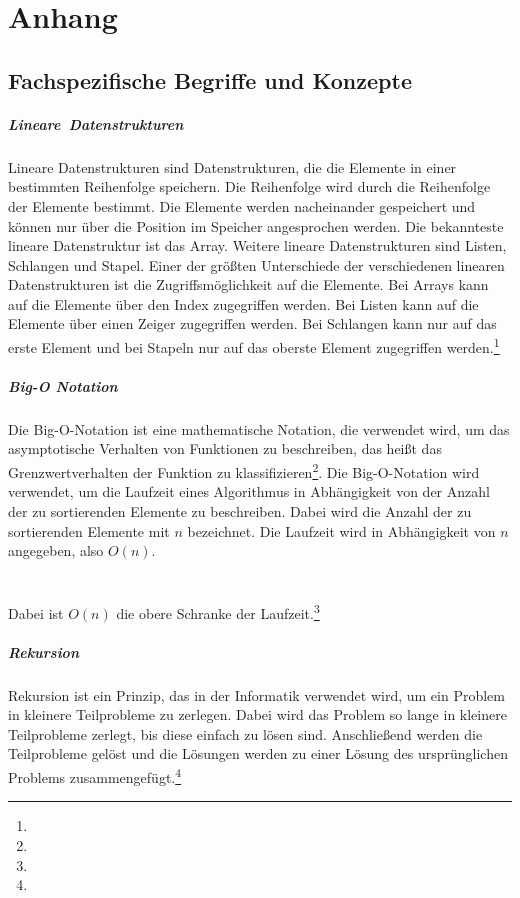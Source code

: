 \documentclass[./entry.tex]{subfiles}
\begin{document}
    \chapter{Anhang}

    \section{Fachspezifische Begriffe und Konzepte}

    \paragraph{Lineare\ Datenstrukturen}
    Lineare Datenstrukturen sind Datenstrukturen, die die Elemente in einer bestimmten Reihenfolge speichern. Die
    Reihenfolge wird durch die Reihenfolge der Elemente bestimmt. Die Elemente werden nacheinander gespeichert und
    können nur über die Position im Speicher angesprochen werden. Die bekannteste lineare Datenstruktur ist
    das Array. Weitere lineare Datenstrukturen sind Listen, Schlangen und Stapel.
    Einer der größten Unterschiede der verschiedenen linearen Datenstrukturen ist die Zugriffsmöglichkeit auf die
    Elemente. Bei Arrays kann auf die Elemente über den Index zugegriffen werden. Bei Listen kann auf die Elemente
    über einen Zeiger zugegriffen werden. Bei Schlangen kann nur auf das erste Element und bei
    Stapeln nur auf das oberste Element zugegriffen werden.\footnote{}

    \paragraph{Big-O Notation}
    Die Big-O-Notation ist eine mathematische Notation, die verwendet wird, um das asymptotische Verhalten von
    Funktionen zu beschreiben, das heißt das Grenzwertverhalten der Funktion zu klassifizieren\footnote{}.
    Die Big-O-Notation wird verwendet, um die Laufzeit eines Algorithmus in Abhängigkeit von der Anzahl der zu
    sortierenden Elemente zu beschreiben. Dabei wird die Anzahl der zu sortierenden Elemente mit $n$ bezeichnet.
    Die Laufzeit wird in Abhängigkeit von $n$ angegeben, also $O(n)$.
    \\\\\\
    Dabei ist $O(n)$ die obere Schranke der Laufzeit.\footnote{}

    \paragraph{Rekursion}
    Rekursion ist ein Prinzip, das in der Informatik verwendet wird, um ein Problem in kleinere Teilprobleme zu
    zerlegen. Dabei wird das Problem so lange in kleinere Teilprobleme zerlegt, bis diese einfach zu lösen sind.
    Anschließend werden die Teilprobleme gelöst und die Lösungen werden zu einer Lösung des ursprünglichen Problems
    zusammengefügt.\footnote{}
\end{document}
